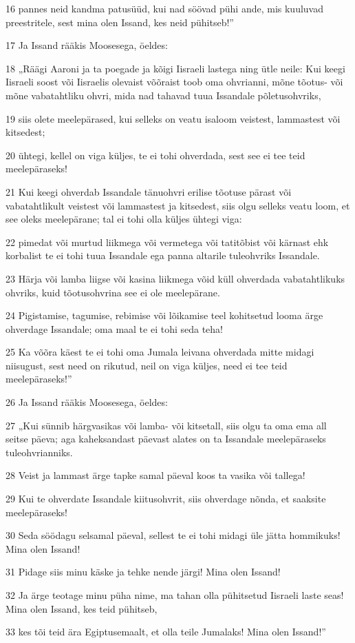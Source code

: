 \par 16 pannes neid kandma patusüüd, kui nad söövad pühi ande, mis kuuluvad preestritele, sest mina olen Issand, kes neid pühitseb!”
\par 17 Ja Issand rääkis Moosesega, öeldes:
\par 18 „Räägi Aaroni ja ta poegade ja kõigi Iisraeli lastega ning ütle neile: Kui keegi Iisraeli soost või Iisraelis olevaist võõraist toob oma ohvrianni, mõne tõotus- või mõne vabatahtliku ohvri, mida nad tahavad tuua Issandale põletusohvriks,
\par 19 siis olete meelepärased, kui selleks on veatu isaloom veistest, lammastest või kitsedest;
\par 20 ühtegi, kellel on viga küljes, te ei tohi ohverdada, sest see ei tee teid meelepäraseks!
\par 21 Kui keegi ohverdab Issandale tänuohvri erilise tõotuse pärast või vabatahtlikult veistest või lammastest ja kitsedest, siis olgu selleks veatu loom, et see oleks meelepärane; tal ei tohi olla küljes ühtegi viga:
\par 22 pimedat või murtud liikmega või vermetega või tatitõbist või kärnast ehk korbalist te ei tohi tuua Issandale ega panna altarile tuleohvriks Issandale.
\par 23 Härja või lamba liigse või kasina liikmega võid küll ohverdada vabatahtlikuks ohvriks, kuid tõotusohvrina see ei ole meelepärane.
\par 24 Pigistamise, tagumise, rebimise või lõikamise teel kohitsetud looma ärge ohverdage Issandale; oma maal te ei tohi seda teha!
\par 25 Ka võõra käest te ei tohi oma Jumala leivana ohverdada mitte midagi niisugust, sest need on rikutud, neil on viga küljes, need ei tee teid meelepäraseks!”
\par 26 Ja Issand rääkis Moosesega, öeldes:
\par 27 „Kui sünnib härgvasikas või lamba- või kitsetall, siis olgu ta oma ema all seitse päeva; aga kaheksandast päevast alates on ta Issandale meelepäraseks tuleohvrianniks.
\par 28 Veist ja lammast ärge tapke samal päeval koos ta vasika või tallega!
\par 29 Kui te ohverdate Issandale kiitusohvrit, siis ohverdage nõnda, et saaksite meelepäraseks!
\par 30 Seda söödagu selsamal päeval, sellest te ei tohi midagi üle jätta hommikuks! Mina olen Issand!
\par 31 Pidage siis minu käske ja tehke nende järgi! Mina olen Issand!
\par 32 Ja ärge teotage minu püha nime, ma tahan olla pühitsetud Iisraeli laste seas! Mina olen Issand, kes teid pühitseb,
\par 33 kes tõi teid ära Egiptusemaalt, et olla teile Jumalaks! Mina olen Issand!”

